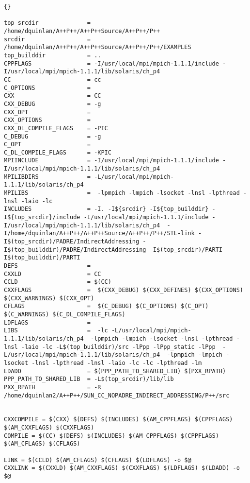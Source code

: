\documentclass[10pt]{llncs}
\begin{document}
\begin{lstlisting}{}

top_srcdir              = /home/dquinlan/A++P++/A++P++Source/A++P++/P++
srcdir                  = /home/dquinlan/A++P++/A++P++Source/A++P++/P++/EXAMPLES
top_builddir            = ..
CPPFLAGS                = -I/usr/local/mpi/mpich-1.1.1/include -I/usr/local/mpi/mpich-1.1.1/lib/solaris/ch_p4 
CC                      = cc
C_OPTIONS               = 
CXX                     = CC
CXX_DEBUG               = -g
CXX_OPT                 = 
CXX_OPTIONS             = 
CXX_DL_COMPILE_FLAGS    = -PIC
C_DEBUG                 = -g
C_OPT                   = 
C_DL_COMPILE_FLAGS      = -KPIC
MPIINCLUDE              = -I/usr/local/mpi/mpich-1.1.1/include -I/usr/local/mpi/mpich-1.1.1/lib/solaris/ch_p4
MPILIBDIRS              = -L/usr/local/mpi/mpich-1.1.1/lib/solaris/ch_p4
MPILIBS                 =  -lpmpich -lmpich -lsocket -lnsl -lpthread -lnsl -laio -lc
INCLUDES                = -I. -I${srcdir} -I${top_builddir} -I${top_srcdir}/include -I/usr/local/mpi/mpich-1.1.1/include -I/usr/local/mpi/mpich-1.1.1/lib/solaris/ch_p4  -I/home/dquinlan/A++P++/A++P++Source/A++P++/P++/STL-link -I$(top_srcdir)/PADRE/IndirectAddressing -I$(top_builddir)/PADRE/IndirectAddressing -I$(top_srcdir)/PARTI -I$(top_builddir)/PARTI
DEFS                    = 
CXXLD                   = CC
CCLD                    = $(CC)
CXXFLAGS                =  $(CXX_DEBUG) $(CXX_DEFINES) $(CXX_OPTIONS) $(CXX_WARNINGS) $(CXX_OPT)
CFLAGS                  =  $(C_DEBUG) $(C_OPTIONS) $(C_OPT) $(C_WARNINGS) $(C_DL_COMPILE_FLAGS)
LDFLAGS                 = 
LIBS                    =  -lc -L/usr/local/mpi/mpich-1.1.1/lib/solaris/ch_p4  -lpmpich -lmpich -lsocket -lnsl -lpthread -lnsl -laio -lc -L$(top_builddir)/src -lPpp -lPpp_static -lPpp  -L/usr/local/mpi/mpich-1.1.1/lib/solaris/ch_p4  -lpmpich -lmpich -lsocket -lnsl -lpthread -lnsl -laio -lc -lc -lpthread -lm
LDADD                   = $(PPP_PATH_TO_SHARED_LIB) $(PXX_RPATH)
PPP_PATH_TO_SHARED_LIB  = -L$(top_srcdir)/lib/lib
PXX_RPATH               = -R /home/dquinlan2/A++P++/SUN_CC_NOPADRE_INDIRECT_ADDRESSING/P++/src


CXXCOMPILE = $(CXX) $(DEFS) $(INCLUDES) $(AM_CPPFLAGS) $(CPPFLAGS) $(AM_CXXFLAGS) $(CXXFLAGS)
COMPILE = $(CC) $(DEFS) $(INCLUDES) $(AM_CPPFLAGS) $(CPPFLAGS) $(AM_CFLAGS) $(CFLAGS)

LINK = $(CCLD) $(AM_CFLAGS) $(CFLAGS) $(LDFLAGS) -o $@
CXXLINK = $(CXXLD) $(AM_CXXFLAGS) $(CXXFLAGS) $(LDFLAGS) $(LDADD) -o $@

\end{lstlisting}
\end{document}
